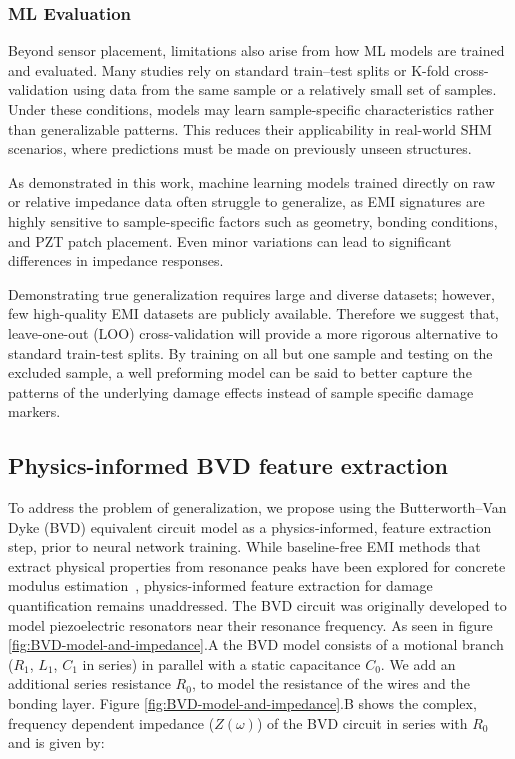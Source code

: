 \documentclass[journal,twoside,web]{ieeecolor}
\begin{document}
\subsubsection{ML Evaluation}

Beyond sensor placement, limitations also arise from how ML models are trained and evaluated. Many studies rely on standard train–test splits or K-fold cross-validation using data from the same sample or a relatively small set of samples. Under these conditions, models may learn sample-specific characteristics rather than generalizable patterns. This reduces their applicability in real-world SHM scenarios, where predictions must be made on previously unseen structures.

As demonstrated in this work, machine learning models trained directly on raw or relative impedance data often struggle to generalize, as EMI signatures are highly sensitive to sample-specific factors such as geometry, bonding conditions, and PZT patch placement. Even minor variations can lead to significant differences in impedance responses.

Demonstrating true generalization requires large and diverse datasets; however, few high-quality EMI datasets are publicly available. Therefore we suggest that, leave-one-out (LOO) cross-validation will provide a more rigorous alternative to standard train-test splits. By training on all but one sample and testing on the excluded sample, a well preforming model can be said to better capture the patterns of the underlying damage effects instead of sample specific damage markers.


\subsection{Physics-informed BVD feature extraction}

To address the problem of generalization, we propose using the Butterworth--Van Dyke (BVD) equivalent circuit model as a physics-informed, feature extraction step, prior to neural network training. While baseline-free EMI methods that extract physical properties from resonance peaks have been explored for concrete modulus estimation~\cite{sha2024baseline}, physics-informed feature extraction for damage quantification remains unaddressed. The BVD circuit was originally developed to model piezoelectric resonators near their resonance frequency. As seen in figure \ref{fig:BVD-model-and-impedance}.A the BVD model consists of a motional branch ($R_1$, $L_1$, $C_1$ in series) in parallel with a static capacitance $C_0$\cite{BVD}. We add an additional series resistance $R_0$, to model the resistance of the wires and the bonding layer. Figure \ref{fig:BVD-model-and-impedance}.B shows the complex, frequency dependent impedance ($Z(\omega)$) of the BVD circuit in series with $R_0$ and is given by:
\end{document}
